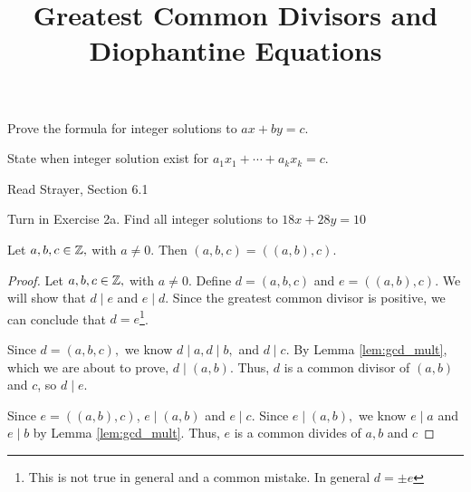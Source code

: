 \documentclass{ximera}
\title{Greatest Common Divisors and Diophantine Equations}
\begin{document}
\begin{abstract}
\end{abstract}
\maketitle


\begin{obj}
	\item Prove the formula for integer solutions to $ax+by=c$.
	\item State when integer solution exist for $a_1x_1+\cdots+a_kx_k=c$.
\end{obj}


\begin{instructorNotes}
	\begin{pre}
		\item[Read] Strayer, Section 6.1
		\item[Turn in] Exercise 2a.
		Find all integer solutions to $18x+28y=10$
	   \end{pre}
\end{instructorNotes}


\begin{lemma}\label{lem:gcd_3case}
	Let $a,b,c\in\mathbb Z,$ with $a\neq 0$. Then $(a,b,c)=((a,b),c).$

 	\begin{proof}
 		Let $a,b,c\in\mathbb Z,$ with $a\neq 0$. Define $d=(a,b,c)$ and $e=((a,b),c).$ We will show that $d\mid e$ and $e\mid d$. Since the greatest common divisor is positive, we can conclude that $d=e$\footnote{This is not true in general and a common mistake. In general $d=\pm e$}.

 		Since $d=(a,b,c),$ we know $d\mid a, d\mid b,$ and $d\mid c$. By Lemma \ref{lem:gcd_mult}, which we are about to prove, $d\mid (a,b)$. Thus, $d$ is a common divisor of $(a,b)$ and $c$, so $d\mid e$.

 		Since $e=((a,b),c)$, $e\mid  (a,b)$ and $e\mid c$. Since $e\mid (a,b),$ we know $e\mid a$ and $e\mid b$ by Lemma \ref{lem:gcd_mult}. Thus, $e$ is a common divides of $a,b$ and $c$
 	\end{proof}
\end{lemma}
\end{document}
